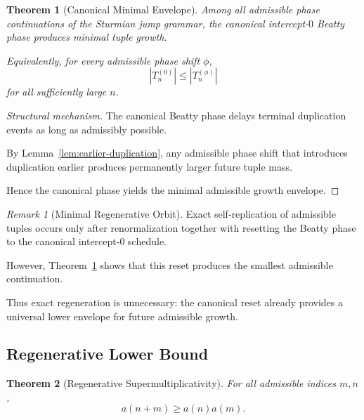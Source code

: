 \documentclass[12pt, oneside]{article}
\numberwithin{equation}{section}
\theoremstyle{definition}
\theoremstyle{plain}
\newtheorem{theorem}{Theorem}[section]
\theoremstyle{remark}
\newtheorem*{remark}{Remark}
\begin{document}
\begin{theorem}[Canonical Minimal Envelope]
\label{thm:minimal-envelope}
Among all admissible phase continuations of the Sturmian jump grammar,
the canonical intercept-$0$ Beatty phase produces minimal tuple growth.

Equivalently, for every admissible phase shift $\phi$,
\[
|T_n^{(0)}|
\le
|T_n^{(\phi)}|
\]
for all sufficiently large $n$.
\end{theorem}

\begin{proof}[Structural mechanism]
The canonical Beatty phase delays terminal duplication events
as long as admissibly possible.

By Lemma~\ref{lem:earlier-duplication}, any admissible phase shift
that introduces duplication earlier produces permanently larger
future tuple mass.

Hence the canonical phase yields the minimal admissible growth
envelope.
\end{proof}


\begin{remark}[Minimal Regenerative Orbit]
Exact self-replication of admissible tuples occurs only after
renormalization together with resetting the Beatty phase to the
canonical intercept-$0$ schedule.

However, Theorem~\ref{thm:minimal-envelope} shows that this reset
produces the smallest admissible continuation.

Thus exact regeneration is unnecessary:
the canonical reset already provides a universal lower envelope for
future admissible growth.
\end{remark}


\subsection{Regenerative Lower Bound}


\begin{theorem}[Regenerative Supermultiplicativity]
\label{thm:supermultiplicative}
For all admissible indices $m,n$,
\[
a(n+m)\ge a(n)a(m).
\]
\end{theorem}
\end{document}

